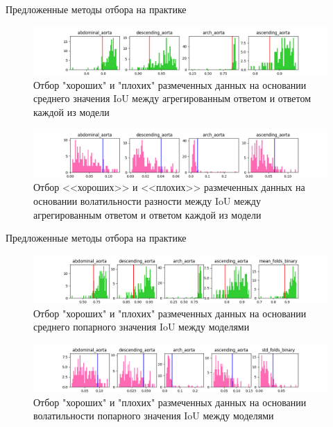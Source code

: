 \documentclass[10pt]{beamer}
\theoremstyle{definition}
\begin{document}
        \begin{frame}{Предложенные методы отбора на практике}
            \begin{figure}[ht]
            \centering
            \includegraphics[width=\textwidth]{var1.png}
            \caption{Отбор "хороших" и "плохих" размеченных данных на основании среднего значения IoU между агрегированным ответом и ответом каждой из модели}
            \end{figure}

            \begin{figure}[ht]
            \centering
            \includegraphics[width=\textwidth]{var2.png}
            \caption{Отбор <<хороших>> и <<плохих>> размеченных данных на основании волатильности разности между  IoU между агрегированным ответом и ответом каждой из модели}
            \end{figure}
        \end{frame}

        \begin{frame}{Предложенные методы отбора на практике}
            \begin{figure}[ht]
            \centering
            \includegraphics[width=\textwidth]{var3.png}
            \caption{Отбор "хороших" и "плохих" размеченных данных на основании среднего попарного значения IoU между моделями}
            \end{figure}

            \begin{figure}[ht]
            \centering
            \includegraphics[width=\textwidth]{var4.png}
            \caption{Отбор "хороших" и "плохих" размеченных данных на основании волатильности попарного значения IoU между моделями}
            \end{figure}
        \end{frame}
	
\end{document}
